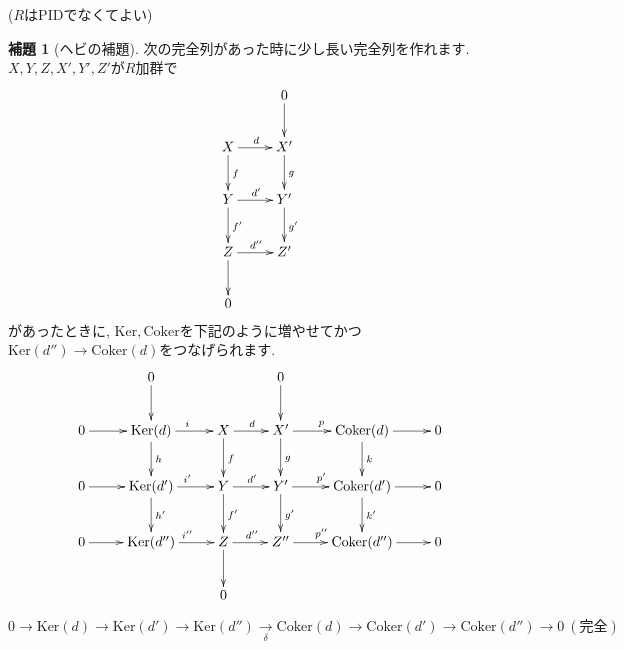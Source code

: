 \documentclass{jsarticle}
\def\Ker{\mathrm{Ker}}
\def\Coker{\mathrm{Coker}}
\theoremstyle{definition}
\newtheorem{lemma}{補題}
\numberwithin{theorem}{section}
\begin{document}
($R$はPIDでなくてよい)
\begin{lemma}[ヘビの補題]
次の完全列があった時に少し長い完全列を作れます. $X, Y, Z, X', Y', Z'$が$R$加群で
\begin{equation*}
\xymatrix{
  & 0 \ar[d]\\
  X \ar[r]^d \ar[d]^f & X' \ar[d]^g\\
  Y \ar[r]^{d'} \ar[d]^{f'} & Y' \ar[d]^{g'}\\
  Z \ar[r]^{d''} \ar[d] & Z'\\
  0 & \\
}
\end{equation*}
があったときに, $\Ker, \Coker$を下記のように増やせてかつ$\Ker(d'') \rightarrow \Coker(d)$をつなげられます. 
\begin{equation*}
\xymatrix{
  & 0 \ar[d] & & 0 \ar[d] \\
  0 \ar[r] & \Ker(d)   \ar[r]^i     \ar[d]^h    & X \ar[r]^d     \ar[d]^f    & X'  \ar[r]^p    \ar[d]^g    & \Coker(d)  \ar[r] \ar[d]^k    & 0\\
  0 \ar[r] & \Ker(d')  \ar[r]^{i'}  \ar[d]^{h'} & Y \ar[r]^{d'}  \ar[d]^{f'} & Y'  \ar[r]^{p'} \ar[d]^{g'} & \Coker(d') \ar[r] \ar[d]^{k'} & 0\\
  0 \ar[r] & \Ker(d'') \ar[r]^{i''}              & Z \ar[r]^{d''} \ar[d]      & Z'' \ar[r]^{p''}             & \Coker(d'') \ar[r]             & 0\\
            &                                      & 0
}
\end{equation*}

\begin{equation*}
0 \rightarrow \Ker(d) \rightarrow \Ker(d') \rightarrow \Ker(d'') \xrightarrow[\delta]{} \Coker(d) \rightarrow \Coker(d') \rightarrow \Coker(d'') \rightarrow 0\ (完全)
\end{equation*}
\end{lemma}
\end{document}
